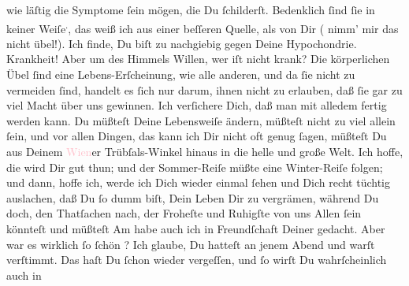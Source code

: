                wie läſtig die Symptome ſein mögen, die Du ſchilderſt. Bedenklich ſind ſie in keiner Weiſe\substVorne{}\textsuperscript{.}\substDazwischen{},\substHinten{} das weiß ich aus einer beſſeren Quelle, als von Dir {\pb}(\strikeout{\textcolor{gray}{ni}} nimm’ mir das nicht übel!). Ich finde, Du biſt zu nachgiebig gegen Deine
               Hypochondrie. Krankheit! Aber um des Himmels Willen, wer iſt nicht krank? Die
               körperlichen Übel ſind eine Lebens-Erſcheinung, wie alle anderen, und da ſie nicht zu
               vermeiden ſind, handelt es ſich nur darum, ihnen nicht zu erlauben, daß ſie gar zu
               viel Macht  über uns gewinnen. Ich verſichere Dich,
               daß man mit alledem fertig werden kann. Du müßteſt {\pb}Deine Lebensweiſe ändern, müßteſt nicht zu viel allein ſein, und vor allen Dingen,
               das kann ich Dir nicht oft genug ſagen, müßteſt Du aus Deinem \textcolor{pink}{Wien}{}\ledrightnote{\textcolor{pink}{Wien}}er Trübſals-Winkel hinaus in die helle und große Welt. Ich
               hoffe, die \label{K_L02848-3v}\label{K_L02848-3h} wird Dir gut thun; und der Sommer-Reiſe müßte eine Winter-Reiſe folgen; und
               dann, hoffe ich, werde ich Dich wieder einmal ſehen {\pb}und Dich recht tüchtig auslachen, daß Du ſo  dumm
               biſt, Dein Leben Dir zu vergrämen, während Du doch, den Thatſachen nach, der Froheſte
               und Ruhigſte von uns Allen ſein könnteſt und müßteſt{\dotsseven}\pend
           \pstart
           Am \strikeout{\textcolor{gray}{A}}{ }\label{K_L02848-4v}\label{K_L02848-4h} habe auch
               ich in Freundſchaft Deiner gedacht. Aber war es wirklich ſo ſchön \label{K_L02848-56v}\label{K_L02848-56h}? Ich glaube, Du hatteſt an jenem{ }Abend{ }\label{K_L02848-5v}\label{K_L02848-5h} und warſt verſtimmt. Das haſt Du ſchon wieder {\pb}vergeſſen, und ſo wirſt Du wahrſcheinlich auch in
